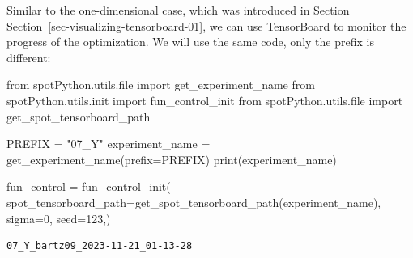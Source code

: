 \documentclass[
  letterpaper,
  DIV=11,
  numbers=noendperiod]{scrreprt}
\newenvironment{Shaded}{\begin{snugshade}}{\end{snugshade}}
\newcommand{\BuiltInTok}[1]{\textcolor[rgb]{0.00,0.23,0.31}{#1}}
\newcommand{\DecValTok}[1]{\textcolor[rgb]{0.68,0.00,0.00}{#1}}
\newcommand{\ImportTok}[1]{\textcolor[rgb]{0.00,0.46,0.62}{#1}}
\newcommand{\NormalTok}[1]{\textcolor[rgb]{0.00,0.23,0.31}{#1}}
\newcommand{\OperatorTok}[1]{\textcolor[rgb]{0.37,0.37,0.37}{#1}}
\newcommand{\StringTok}[1]{\textcolor[rgb]{0.13,0.47,0.30}{#1}}
\begin{document}
\begin{tcolorbox}[enhanced jigsaw, left=2mm, toprule=.15mm, colframe=quarto-callout-note-color-frame, leftrule=.75mm, title=\textcolor{quarto-callout-note-color}{\faInfo}\hspace{0.5em}{TensorBoard}, toptitle=1mm, opacitybacktitle=0.6, arc=.35mm, titlerule=0mm, opacityback=0, bottomtitle=1mm, coltitle=black, rightrule=.15mm, colback=white, colbacktitle=quarto-callout-note-color!10!white, breakable, bottomrule=.15mm]

Similar to the one-dimensional case, which was introduced in Section
Section~\ref{sec-visualizing-tensorboard-01}, we can use TensorBoard to
monitor the progress of the optimization. We will use the same code,
only the prefix is different:

\begin{Shaded}
\begin{Highlighting}[]
\ImportTok{from}\NormalTok{ spotPython.utils.}\BuiltInTok{file} \ImportTok{import}\NormalTok{ get\_experiment\_name}
\ImportTok{from}\NormalTok{ spotPython.utils.init }\ImportTok{import}\NormalTok{ fun\_control\_init}
\ImportTok{from}\NormalTok{ spotPython.utils.}\BuiltInTok{file} \ImportTok{import}\NormalTok{ get\_spot\_tensorboard\_path}

\NormalTok{PREFIX }\OperatorTok{=} \StringTok{"07\_Y"}
\NormalTok{experiment\_name }\OperatorTok{=}\NormalTok{ get\_experiment\_name(prefix}\OperatorTok{=}\NormalTok{PREFIX)}
\BuiltInTok{print}\NormalTok{(experiment\_name)}

\NormalTok{fun\_control }\OperatorTok{=}\NormalTok{ fun\_control\_init(}
\NormalTok{    spot\_tensorboard\_path}\OperatorTok{=}\NormalTok{get\_spot\_tensorboard\_path(experiment\_name),}
\NormalTok{    sigma}\OperatorTok{=}\DecValTok{0}\NormalTok{,}
\NormalTok{    seed}\OperatorTok{=}\DecValTok{123}\NormalTok{,)}
\end{Highlighting}
\end{Shaded}

\begin{verbatim}
07_Y_bartz09_2023-11-21_01-13-28
\end{verbatim}

\end{tcolorbox}
\end{document}
